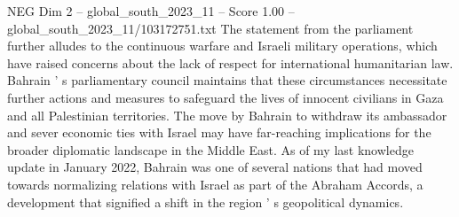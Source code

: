 \begin{textsample}{NEG Dim 2 – global\_south\_2023\_11 – Score 1.00 – global\_south\_2023\_11/103172751.txt}
The statement from the parliament further alludes to the continuous warfare and Israeli military operations, which have raised concerns about the lack of respect for international humanitarian law.
Bahrain ' s parliamentary council maintains that these circumstances necessitate further actions and measures to safeguard the lives of innocent civilians in Gaza and all Palestinian territories.
The move by Bahrain to withdraw its ambassador and sever economic ties with Israel may have far-reaching implications for the broader diplomatic landscape in the Middle East.
As of my last knowledge update in January 2022, Bahrain was one of several nations that had moved towards normalizing relations with Israel as part of the Abraham Accords, a development that signified a shift in the region ' s geopolitical dynamics.

\end{textsample}
